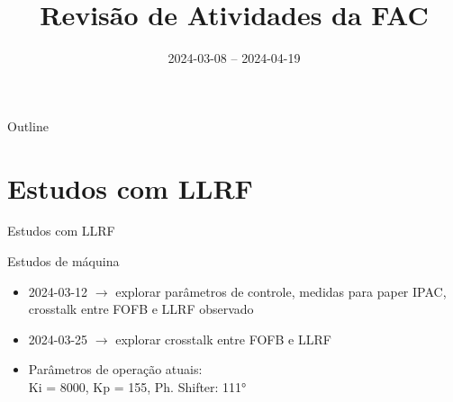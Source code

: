 \documentclass[1611]{beamer}					  %
\title{Revisão de Atividades da FAC}	%
\institute{LNLS.DAC.FAC}				%
\date{2024-03-08 -- 2024-04-19}			%
\begin{document}
\begin{frame}
  \titlepage
  \href{https://github.com/lnls-fac/doc-review-dac-fac}{}
  \href{https://www.overleaf.com/read/sbdjxtzfchrm}{}
\end{frame}

\begin{frame}{Outline}
  \tableofcontents
\end{frame}



\section{Estudos com LLRF}

\begin{frame}
    \Huge{Estudos com LLRF}
\end{frame}

\begin{frame}{Estudos de máquina}
\begin{itemize}
    \item 2024-03-12 $\to$ explorar parâmetros de controle, medidas para paper IPAC, crosstalk entre FOFB e LLRF observado
    \item 2024-03-25 $\to$ explorar crosstalk entre FOFB e LLRF

    \item Parâmetros de operação atuais: \\
    Ki = 8000, Kp = 155, Ph. Shifter: 111°
\end{itemize}
\end{frame}
\end{document}
